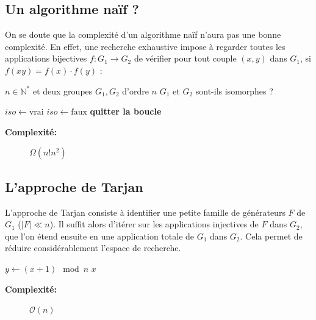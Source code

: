 \documentclass[12pt]{article}
\begin{document}
\subsection{Un algorithme naïf ?}
On se doute que la complexité d'un algorithme naïf n'aura pas une bonne complexité. En effet, une recherche exhaustive impose à regarder toutes les applications bijectives $f: G_1  \xrightarrow{} G_2$ de vérifier pour tout couple $(x,y)$ dans $G_1$, si $f(xy)= f(x) \cdot f(y)$ : \\
\begin{algorithm}[H]
\caption{Recherche exhaustive d'isomorphisme}
\begin{algorithmic}[1]
    \Require $n \in \mathbb{N^*}$ et deux groupes $G_1, G_2$ d'ordre $n$
    \Ensure $G_1$ et $G_2$ sont-ils isomorphes ?
    
        \State $iso \gets \text{vrai}$
                \State $iso \gets \text{faux}$
                \State \textbf{quitter la boucle} 
            \EndIf
        \EndFor
            \State \Return {} 
        \EndIf
    \EndFor
    \State \Return {}
\end{algorithmic}
\end{algorithm}

\begin{description}
    \item[\textbf{Complexité: }] $\Omega(n!n^2)$
\end{description}

\subsection{L'approche de Tarjan}
L'approche de Tarjan consiste à identifier une petite famille de générateurs $F$ de $G_1$ ($|F| \ll n$). Il suffit alors d'itérer sur les applications injectives de $F$ dans $G_2$, que l'on étend ensuite en une application totale de $G_1$ dans $G_2$. Cela permet de réduire considérablement l'espace de recherche. \\

\begin{algorithm}[H]
\caption{Neutre}
\begin{algorithmic}
        \State $y \gets (x+1) \mod{n}$
            \State \Return $x$
        \EndIf
    \EndFor
\end{algorithmic}
\end{algorithm}
\begin{description}
    \item[\textbf{Complexité:}] $\mathcal{O}(n)$ 
\end{description}
\end{document}
